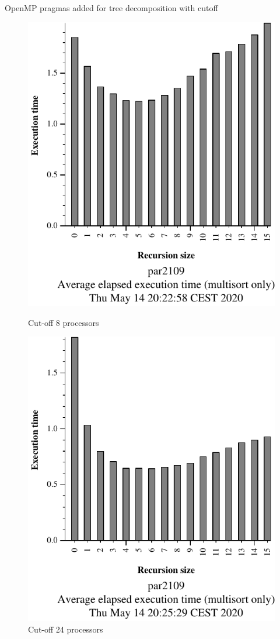 \begin{listing}[H]
\inputminted[firstline=32,lastline=74]{c}{sources/multisort-omp-tree-cutoff.c}
\caption{OpenMP pragmas added for tree decomposition with cutoff}
\label{listing:omp_tree_cutoff}
\end{listing}

\begin{figure}[H]
    \begin{minipage}{0.5\textwidth}
        \centering
        \includegraphics[width=0.7\linewidth]{plots/cutoff-8-crop.pdf}
        \caption{Cut-off 8 processors}
        \label{fig:cutoff8} 
    \end{minipage}
    \begin{minipage}{0.5\textwidth}
        \centering
        \includegraphics[width=0.7\linewidth]{plots/cutoff-24-crop.pdf}
        \caption{Cut-off 24 processors}
        \label{fig:cutoff24} 
    \end{minipage}
\end{figure}

